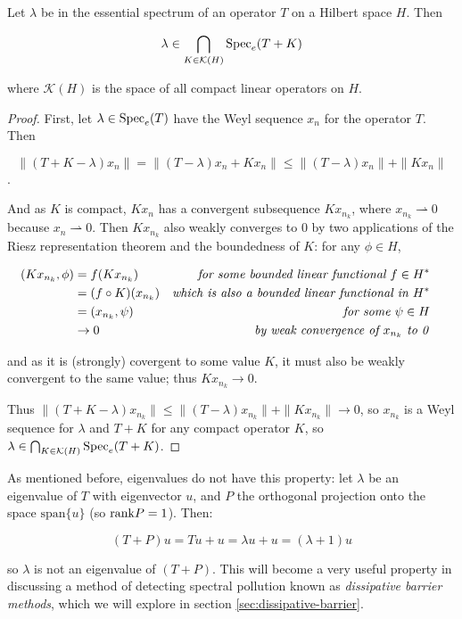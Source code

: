 \documentclass[../main.tex]{subfiles}
\begin{document}
\begin{theorem}
Let $\lambda$ be in the essential spectrum of an operator $T$ on a Hilbert space $H$. Then

\begin{equation}\label{eqn:weyl_spectrum}
\lambda \in \bigcap_{K \in \mathcal{K}(H)} \mathrm{Spec}_e(T + K)
\end{equation}

where $\mathcal{K}(H)$ is the space of all compact linear operators on $H$.
\end{theorem}
\begin{proof}
First, let $\lambda \in \mathrm{Spec}_e(T)$ have the Weyl sequence $x_n$ for the operator $T$. Then 

$$\|(T+K-\lambda)x_n\| = \|(T - \lambda)x_n+Kx_n\| \leq \|(T - \lambda)x_n\| + \|Kx_n\|$$. 

And as $K$ is compact, $Kx_n$ has a convergent subsequence $Kx_{n_k}$, where $x_{n_k} \rightharpoonup 0$ because $x_n \rightharpoonup 0$.
Then $Kx_{n_k}$ also weakly converges to 0 by two applications of the Riesz representation theorem and the boundedness of $K$: for any $\phi \in H$,

\begin{align*}
(Kx_{n_k}, \phi) & = f(Kx_{n_k}) & \text{\emph{for some bounded linear functional $f \in H^*$}}\\
& = (f \circ K) (x_{n_k}) & \text{\emph{which is also a bounded linear functional in $H^*$}}\\
& = (x_{n_k}, \psi) & \text{\emph{for some $\psi \in H$}}&\\
& \rightarrow 0 & \text{\emph{by weak convergence of $x_{n_k}$ to 0}}
\end{align*}

and as it is (strongly) covergent to some value $K$, it must also be weakly convergent to the same value; thus $Kx_{n_k} \rightarrow 0$.

Thus $\|(T+K-\lambda)x_{n_k}\| \leq \|(T - \lambda)x_{n_k}\| + \|Kx_{n_k}\| \rightarrow 0$, so $x_{n_k}$ is a Weyl sequence for $\lambda$ and $T+K$ 
for any compact operator $K$, so $\lambda \in \bigcap_{K \in \mathcal{K}(H)} \mathrm{Spec}_e(T + K)$.
\end{proof}

\begin{remark}
As mentioned before, eigenvalues do not have this property: let $\lambda$ be an eigenvalue of $T$ with eigenvector $u$, and $P$ the orthogonal 
projection onto the space $\mathrm{span}\{u\}$ (so $\mathrm{rank} P = 1$). Then:

$$(T+P) u = Tu + u = \lambda u + u = (\lambda + 1)u$$

so $\lambda$ is not an eigenvalue of $(T+P)$. This will become a very useful property in discussing a method of detecting spectral pollution known as 
\emph{dissipative barrier methods}, which we will explore in section \ref{sec:dissipative-barrier}.
\end{remark}
\end{document}
